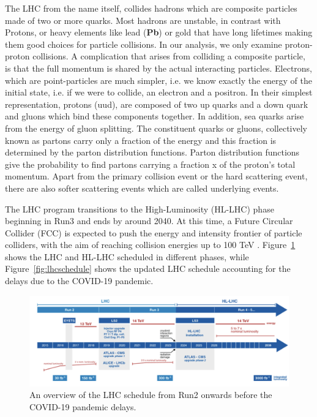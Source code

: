 The LHC from the name itself, collides hadrons which are composite particles made of two or more quarks. Most hadrons are unstable, in contrast with Protons, or heavy elements like lead (\textbf{Pb}) or gold that have long lifetimes making them good choices for particle collisions. In our analysis, we only examine proton-proton collisions. A complication that arises from colliding a composite particle, is that the full momentum is shared by the actual interacting particles. Electrons, which are point-particles are much simpler, i.e. we know exactly the energy of the initial state, i.e. if we were to collide, an electron and a positron. In their simplest representation, protons (uud), are composed of two up quarks and a down quark and gluons which bind these components together. In addition, sea quarks arise from the energy of gluon splitting. The constituent quarks or gluons, collectively known as partons carry only a fraction of the energy and this fraction is determined by the parton distribution functions. Parton distribution functions give the probability to find partons carrying a fraction x of the proton's total momentum. Apart from the primary collision event or the hard scattering event, there are also softer scattering events which are called underlying events. 

The LHC program transitions to the High-Luminosity (HL-LHC) phase beginning in Run3 and ends by around 2040. At this time, a Future Circular Collider (FCC) is expected to push the energy and intensity frontier of particle colliders, with the aim of reaching collision energies up to 100 TeV \cite{Blondel:2021ema}. Figure~\ref{fig:hl-lhc} shows the LHC and HL-LHC scheduled in different phases, while Figure~\ref{fig:lhcschedule} shows the updated LHC schedule accounting for the delays due to the COVID-19 pandemic.

\begin{figure}[!htb]
	\centering
	\includegraphics[scale=0.6]{fig/LHC-schedule.png}
	\caption{An overview of the LHC schedule from Run2 onwards before the COVID-19 pandemic delays.}
	\label{fig:hl-lhc}
\end{figure}


